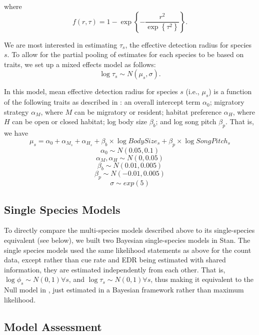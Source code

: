 \documentclass[12pt]{article}
\begin{document}
where 
$$f(r,\tau) =  1 - \exp\left\{ -\dfrac{r^2}{\exp\left\{\tau^2\right\}} \right\} .$$

\par We are most interested in estimating $\tau_s$, the effective detection radius for species $s$. 
To allow for the partial pooling of estimates for each species to be based on traits, we set up a mixed effects model as follows:
$$\log \tau_s \sim N(\mu_s, \sigma).$$

\par In this model, mean effective detection radius for species $s$ (i.e., $\mu_s$) is a function of the following traits as described in \cite{solymos_phylogeny_2018}: an overall intercept term $\alpha_0$; migratory strategy $\alpha_M$, where $M$ can be migratory or resident; habitat preference $\alpha_H$, where $H$ can be open or closed habitat; log body size $\beta_b$; and log song pitch $\beta_p$. 
That is, we have
$$ \mu_s = \alpha_0 + \alpha_{M_s} + \alpha_{H_s} + \beta_b \times \log BodySize_s + \beta_p \times \log SongPitch_s$$
$$\alpha_0 \sim N(0.05, 0.1)$$
$$ \alpha_M, \alpha_H \sim N(0, 0.05)$$
$$ \beta_b \sim N(0.01, 0.005)$$
$$ \beta_p \sim N(-0.01, 0.005) $$
$$\sigma \sim exp(5)$$

\subsection{Single Species Models}

\par To directly compare the multi-species models described above to its single-species equivalent (see below), we built two Bayesian single-species models in Stan.
The single species models used the same likelihood statements as above for the count data, except rather than cue rate and EDR being estimated with shared information, they are estimated independently from each other.
That is, $\log \phi_s \sim N(0,1) \forall s$, and $\log \tau_s \sim N(0,1) \forall s$, thus making it equivalent to the Null model in \citet{edwards_point_2023}, just estimated in a Bayesian framework rather than maximum likelihood. 

\subsection{Model Assessment}
\end{document}
